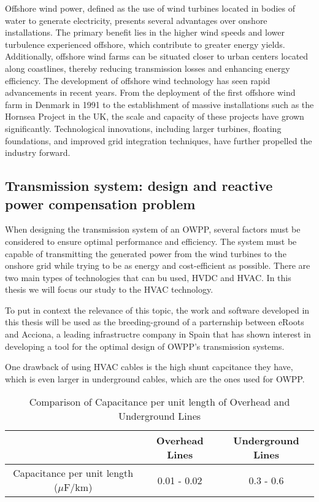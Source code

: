 \documentclass[a4paper,11pt, titlepage, twoside]{article}
\begin{document}
Offshore wind power, defined as the use of wind turbines located in bodies of water to generate electricity, presents several advantages over onshore installations. The primary benefit lies in the higher wind speeds
and lower turbulence experienced offshore, which contribute to greater energy yields. Additionally, offshore wind farms can be situated closer to urban centers located along coastlines, thereby reducing transmission
losses and enhancing energy efficiency. The development of offshore wind technology has seen rapid advancements in recent years. From the deployment of the first offshore wind farm in Denmark in 1991 to the establishment
of massive installations such as the Hornsea Project in the UK, the scale and capacity of these projects have grown significantly. Technological innovations, including larger turbines, floating foundations, and improved
grid integration techniques, have further propelled the industry forward.

\subsection{Transmission system: design and reactive power compensation problem}

When designing the transmission system of an OWPP, several factors must be considered to ensure optimal performance and efficiency. The system must be capable of transmitting the generated power from the wind turbines to the onshore grid
while trying to be as energy and cost-efficient as possible. There are two main types of technologies that can bu used, HVDC and HVAC. In this thesis we will focus our study to the HVAC technology.\par

To put in context the relevance of this topic, the work and software developed in this thesis will be used
as the breeding-ground of a parternship between eRoots and Acciona, a leading infrastructre company in Spain that has shown interest in developing a tool for the optimal design
of OWPP's transmission systems.

One drawback of using HVAC cables is the high shunt capcitance they have, which is even larger in underground cables,
which are the ones used for OWPP.

\begin{table}[h]
    \centering
    \begin{tabular}{|c|c|c|}
    \hline
     & Overhead Lines & Underground Lines \\
     \hline
    Capacitance per unit length ($\mu$F/km) & 0.01 - 0.02  & 0.3 - 0.6 \\
    \hline
    \end{tabular}
    \caption{Comparison of Capacitance per unit length of Overhead and Underground Lines}
    \label{tab:capacitance_comparison}
    \end{table}
\end{document}
